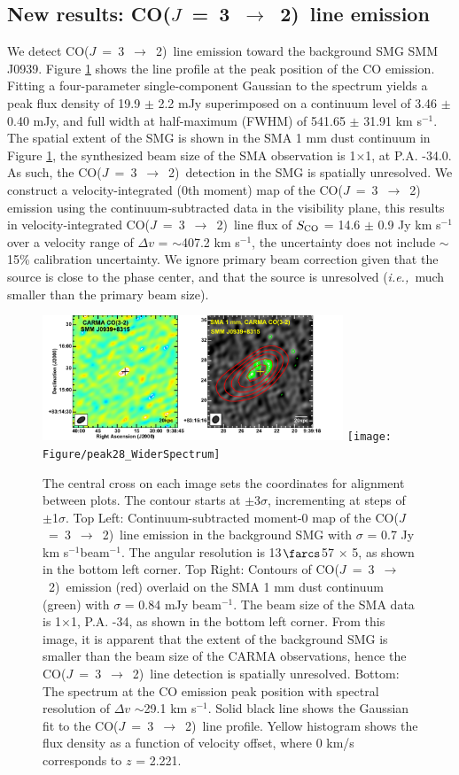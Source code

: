 \documentclass[twocolumn,apj,numberedappendix]{emulateapj}
\newcommand{\CO}{\mbox{CO($J$ = 3 $\rightarrow$ 2) }}
\newcommand{\ie}{{\sl i.e.,~}}
\newcommand{\pmOne}{$^{-1}$}
\begin{document}
\subsection{New results: \CO line emission}
We detect \CO line emission toward the background SMG SMM J0939. Figure \ref{fig:mom0} shows the line profile at the peak position of the CO emission. Fitting a four-parameter single-component Gaussian to the spectrum yields a peak flux density of 19.9 $\pm
$ 2.2 mJy superimposed on a continuum level of 3.46 $\pm$ 0.40 mJy, and full width at half-maximum (FWHM) of 541.65 $\pm$ 31.91 km s\pmOne. 
The spatial extent of the SMG is shown in the SMA 1 mm dust continuum in Figure \ref{fig:mom0}, the 
synthesized beam size of the SMA observation is 1$ \times $1, at P.A. -34.0\degr. As such, the \CO detection in the SMG is spatially unresolved. We construct a velocity-integrated (0th moment) map of the \CO 
emission using the continuum-subtracted data in the visibility plane, this results in velocity-integrated \CO line flux of $S_{\rm CO}$ = 14.6 $\pm$ 0.9 Jy km s\pmOne over a velocity range of $\Delta v$ = $\sim$407.2 km s\pmOne, the uncertainty does not include $\sim$ 15\% calibration uncertainty. We ignore primary beam correction given that the source is close to the phase center, and that the source is unresolved (\ie much smaller than the primary beam size).

\begin{figure}[tbph] 
\centering
\includegraphics[width=0.8\textwidth]{Figure/LinePanel}
\texttt{[image: Figure/peak28\_WiderSpectrum]}
\caption{The central cross on each image sets the coordinates for alignment between plots. The contour starts at $\pm$3$\sigma$, 
incrementing at
steps of $\pm$1$\sigma$. Top Left: Continuum-subtracted moment-0 map of the \CO line emission in 
the background SMG with $\sigma$ = 0.7 Jy km s\pmOne beam\pmOne. The angular resolution is 13$\farcs$57 $\times$ 
5, as shown in the bottom left corner. 
Top Right: Contours of \CO emission (red) overlaid on the SMA 1 mm dust continuum (green) with $
\sigma$ = 0.84 mJy beam\pmOne. The beam size of the SMA data is 1$ \times $1, P.A. -34\degr, as shown 
in the bottom left corner. From this image, it is apparent that the extent of the background SMG is smaller than the beam 
size of the CARMA observations, hence the \CO line detection is spatially unresolved. Bottom: 
The spectrum at the CO emission peak position with spectral resolution of $\Delta v$ $\sim$29.1 km s\pmOne.
Solid black line shows the Gaussian fit to the \CO line profile. Yellow histogram shows the 
flux density as a function of velocity offset, where 0 km/s corresponds to $z$ = 2.221. \label{fig:mom0}}
\end{figure}
\end{document}
